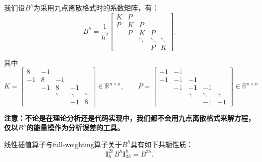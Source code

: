 \documentclass[lang=cn,10pt]{elegantbook}
\begin{document}
我们设$B^h$为采用九点离散格式时的系数矩阵，有：
\begin{equation}
  B^h=\frac{1}{h^2}\begin{bmatrix}
    K & P & \\
    P & K & P & \\
    & P & K & P &\\
    & & \ddots & \ddots & \ddots\\
    & & & P & K
  \end{bmatrix}.
\end{equation}

其中
\begin{equation}
  K=\begin{bmatrix}
    8 & -1 & \\
    -1 & 8 & -1 & \\
    & -1 & 8 & -1 &\\
    & & \ddots & \ddots & \ddots\\
    & & & -1 & 8
  \end{bmatrix}\in\mathbb{R}^{n\times n}, \qquad 
  P=\begin{bmatrix}
    -1 & -1 & \\
    -1 & -1 & -1 & \\
    & -1 & -1 & -1 &\\
    & & \ddots & \ddots & \ddots\\
    & & & -1 & -1
  \end{bmatrix}\in\mathbb{R}^{n\times n}
\end{equation}

\textbf{注意：不论是在理论分析还是代码实现中，我们都不会用九点离散格式来解方程，仅以$B^h$的能量模作为分析误差的工具。}

\begin{lemma}
  线性插值算子与full-weighting算子关于$B^h$具有如下共轭性质：
  \begin{equation}
    \mathbf{I}_h^{2h}B^h\mathbf{I}_{2h}^h=B^{2h}.
  \end{equation}
\end{lemma}
\end{document}
